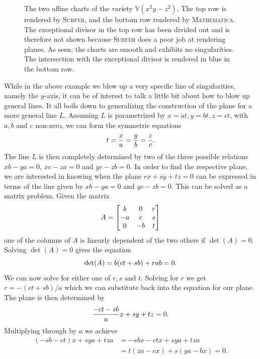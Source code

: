 \documentclass{article}
\newcommand{\V}{\mathbb{V}}
\begin{document}
\begin{example}
\begin{figure}[h!]
\begin{subfigure}[t]{0.3\textwidth}
        \end{subfigure}
        \caption{The two affine charts of the variety $\V(x^2y-z^2)$. The top
            row is rendered by \textsc{Surfer}, and the bottom row rendered by
            \textsc{Mathematica.} The exceptional divisor in the top row has
            been divided out and is therefore not shown because \textsc{Surfer}
        does a poor job at rendering planes. As seen, the charts are smooth and
    exhibits no singularities. The intersection with the exceptional divisor is
rendered in blue in the bottom row.}
    \end{figure}
\end{example}

While in the above example we blew up a very specific line of singularities,
namely the $y$-axis, it can be of interest to talk a little bit about how to
blow up general lines. It all boils down to generalizing the construction of
the plane for a more general line $L$. Assuming $L$ is parametrized by $x = at,
y = bt, z = ct$, with $a, b$ and $c$ non-zero, we can form the symmetric
equations 
\begin{equation}
    \notag
    t = \frac{x}{a} = \frac{y}{b} = \frac{z}{c}.
\end{equation}
The line $L$ is then completely determined by two of the three possible
relations $xb - ya = 0$, $xc - za = 0$ and $yc - zb = 0$.  In order to find the
respective plane, we are interested in knowing when the plane $rx + sy + tz =
0$ can be expressed in terms of the line given by $xb - ya = 0$ and $yc - zb =
0$. This can be solved as a matrix problem. Given the matrix
\begin{equation}
    \notag
    A = \begin{bmatrix}
        b & 0 & r \\
        -a & c & s \\
        0 & -b & t
    \end{bmatrix}
\end{equation}
one of the columns of $A$ is linearly dependent of the two others if $\det(A) =
0$. Solving $\det(A) = 0$ gives the equation
\begin{equation}
    \notag
    \det(A) = b(ct + sb) + rab = 0.
\end{equation}
We can now solve for either one of $r, s$ and $t$. Solving for $r$ we get $r =
-( ct + sb ) / a$ which we can substitute back into the equation for our plane.
The plane is then determined by 
\begin{equation}
    \notag
    \frac{-ct - sb}{a}x + sy + tz = 0.
\end{equation}
Multiplying through by $a$ we achieve
\begin{align*}
    (-sb - ct)x + sya + tza &= -sbx - ctx + sya + tza \\
                            &= t(za - cx) + s(ya - bx) = 0.
\end{align*}
\clearpage
\appendix
\end{document}
